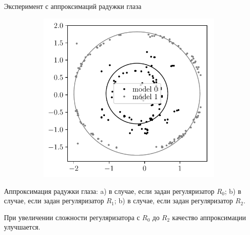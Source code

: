 \documentclass[10pt,pdf,hyperref={unicode}]{beamer}
\begin{document}
\begin{frame}{Эксперимент с аппроксимаций радужки глаза}
\begin{figure}
\begin{subfigure}[b]{0.3\textwidth}
         \caption{}
     \end{subfigure}
     \begin{subfigure}[b]{0.3\textwidth}
         \centering
         \includegraphics[width=\textwidth]{figures/prior_regular_real_example}
         \caption{}
     \end{subfigure}
\end{figure}

Аппроксимация радужки глаза: a) в случае, если задан регуляризатор $R_0$; b) в случае, если задан регуляризатор $R_1$; b) в случае, если задан регуляризатор $R_2$.

При увеличении сложности регуляризатора с $R_0$ до $R_2$ качество аппроксимации улучшается.

\end{frame}
\end{document}
